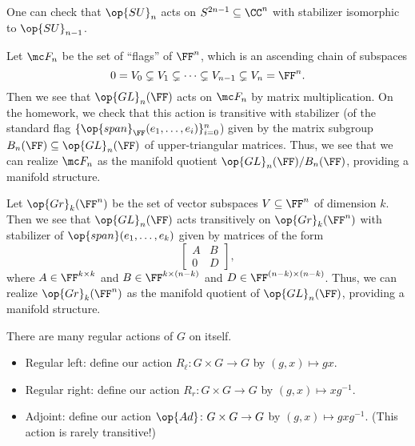\documentclass[../notes.tex]{subfiles}
\begin{document}
\begin{example}
	One can check that $\op{SU}_n$ acts on $S^{2n-1}\subseteq\CC^n$ with stabilizer isomorphic to $\op{SU}_{n-1}$.%
\end{example}
\begin{example}
	Let $\mc F_n$ be the set of ``flags'' of $\FF^n$, which is an ascending chain of subspaces
	\[0=V_0\subsetneq V_1\subsetneq\cdots\subsetneq V_{n-1}\subsetneq V_n=\FF^n.\]
	Then we see that $\op{GL}_n(\FF)$ acts on $\mc F_n$ by matrix multiplication. On the homework, we check that this action is transitive with stabilizer (of the standard flag $\{\op{span}_\FF(e_1,\ldots,e_i)\}_{i=0}^n$) given by the matrix subgroup $B_n(\FF)\subseteq\op{GL}_n(\FF)$ of upper-triangular matrices. Thus, we see that we can realize $\mc F_n$ as the manifold quotient $\op{GL}_n(\FF)/B_n(\FF)$, providing a manifold structure.
\end{example}
\begin{example}[Grassmannians]
	Let $\op{Gr}_k(\FF^n)$ be the set of vector subspaces $V\subseteq\FF^n$ of dimension $k$. Then we see that $\op{GL}_n(\FF)$ acts transitively on $\op{Gr}_k(\FF^n)$ with stabilizer of $\op{span}(e_1,\ldots,e_k)$ given by matrices of the form
	\[\begin{bmatrix}
		A & B \\
		0 & D
	\end{bmatrix},\]
	where $A\in\FF^{k\times k}$ and $B\in\FF^{k\times(n-k)}$ and $D\in\FF^{(n-k)\times(n-k)}$. Thus, we can realize $\op{Gr}_k(\FF^n)$ as the manifold quotient of $\op{GL}_n(\FF)$, providing a manifold structure.
\end{example}
\begin{example}
	There are many regular actions of $G$ on itself.
	\begin{itemize}
		\item Regular left: define our action $R_\ell\colon G\times G\to G$ by $(g,x)\mapsto gx$.
		\item Regular right: define our action $R_r\colon G\times G\to G$ by $(g,x)\mapsto xg^{-1}$.
		\item Adjoint: define our action $\op{Ad}\colon G\times G\to G$ by $(g,x)\mapsto gxg^{-1}$. (This action is rarely transitive!)
	\end{itemize}
\end{example}
\end{document}
